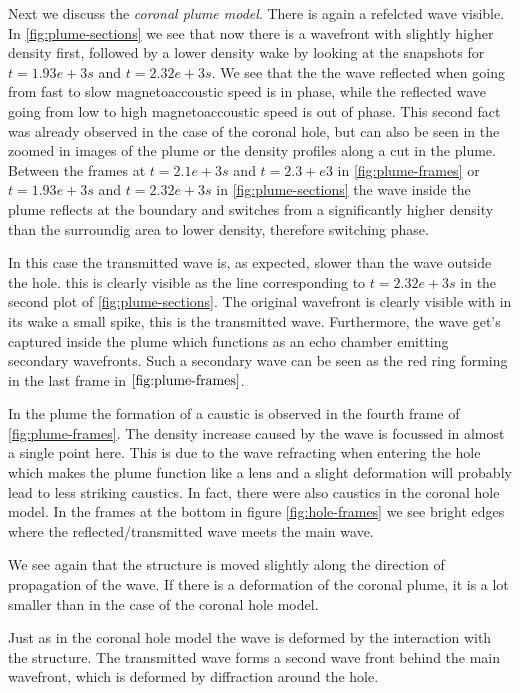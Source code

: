 Next we discuss the \emph{coronal plume model}. There is again a refelcted wave visible.
In \cref{fig:plume-sections} we see that now there is a wavefront with slightly higher density first, followed by a lower density wake by looking at the snapshots for $t=1.93e+3 s$ and $t=2.32e+3 s$.
We see that the the wave reflected when going from fast to slow magnetoaccoustic speed is in phase, while the reflected wave going from low to high magnetoaccoustic speed is out of phase.
This second fact was already observed in the case of the coronal hole, but can also be seen in the zoomed in images of the plume or the density profiles along a cut in the plume.
Between the frames at $t=2.1e+3 s$ and $t=2.3+e3$ in \cref{fig:plume-frames}  or $t=1.93e+3 s$ and $t=2.32e+3 s$ in \cref{fig:plume-sections} the wave inside the plume reflects at the boundary and switches from a significantly higher density than the surroundig area to lower density, therefore switching phase.

In this case the transmitted wave is, as expected, slower than the wave outside the hole.
this is clearly visible as the line corresponding to $t=2.32e+3 s$ in the second plot of \cref{fig:plume-sections}.
The original wavefront is clearly visible with in its wake a small spike, this is the transmitted wave.
Furthermore, the wave get's captured inside the plume which functions as an echo chamber emitting secondary wavefronts.
Such a secondary wave can be seen as the red ring forming in the last frame in $\cref{fig:plume-frames}$.

In the plume the formation of a caustic is observed in the fourth frame of \cref{fig:plume-frames}. 
The density increase caused by the wave is focussed in almost a single point here. 
This is due to the wave refracting when entering the hole which makes the plume function like a lens and a slight deformation will probably lead to less striking caustics.
In fact, there were also caustics in the coronal hole model.
In the frames at the bottom in figure \cref{fig:hole-frames} we see bright edges where the reflected/transmitted wave meets the main wave.

We see again that the structure is moved slightly along the direction of propagation of the wave. 
If there is a deformation of the coronal plume, it is a lot smaller than in the case of the coronal hole model.

Just as in the coronal hole model the wave is deformed by the interaction with the structure.
The transmitted wave forms a second wave front behind the main wavefront, which is deformed by diffraction around the hole.













